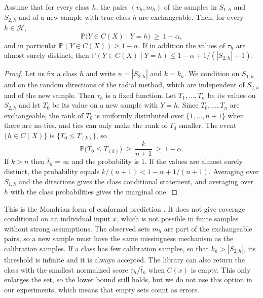 \begin{theorem}\label{thm:coverage}
Assume that for every class $h$, the pairs $(v_h,m_h)$ of the samples in $S_{1,h}$ and $S_{2,h}$ and of a new sample with true 
class $h$ are exchangeable. Then, for every $h\in\mathcal H$,
\[ \mathbb P\bigl(Y\in C(X)\mid Y=h\bigr)\ \ge\ 1-\alpha ,\]
and in particular $\mathbb P(Y\in C(X))\ge 1-\alpha$. If in addition the values of $\tau_h$ are almost surely distinct, then 
$\mathbb P(Y\in C(X)\mid Y=h)\le 1-\alpha+1/(|S_{2,h}|+1)$.
\end{theorem}

\begin{proof}
Let us fix a class $h$ and write $n=|S_{2,h}|$ and $k=k_h$. We condition on $S_{1,h}$ and on the random directions of the radial 
method, which are independent of $S_{2,h}$ and of the new sample. Then $\tau_h$ is a fixed function. Let $T_1,\dots,T_n$ be its 
values on $S_{2,h}$ and let $T_0$ be its value on a new sample with $Y=h$. Since $T_0, \dots, T_n$ are exchangeable, the rank of 
$T_0$ is uniformly distributed over $\{1, \dots, n+1\}$ when there are no ties, and ties can only make the rank of $T_0$ smaller. 
The event $\{h\in C(X)\}$ is $\{T_0\le T_{(k)}\}$, so  \[ \mathbb P\bigl(T_0\le T_{(k)}\bigr)\ \ge\ \frac{k}{n+1}\ \ge\ 1-\alpha .\]
If $k>n$ then $\hat t_h=\infty$ and the probability is $1$. If the values are almost surely distinct, the probability equals 
$k/(n+1)<1-\alpha+1/(n+1)$. Averaging over $S_{1,h}$ and the directions gives the class conditional statement, and averaging over 
$h$ with the class probabilities gives the marginal one.
\end{proof}

This is the Mondrian form of conformal prediction \cite{vovk2005algorithmic}. It does not give coverage conditional on an 
individual input $x$, which is not possible in finite samples without strong assumptions. The observed sets $m_h$ are part of the 
exchangeable pairs, so a new sample must have the same missingness mechanism as the calibration samples. If a class has few 
calibration samples, so that $k_h>|S_{2,h}|$, its threshold is infinite and it is always accepted. The library can also return 
the class with the smallest normalized score $\tau_h/\hat t_h$ when $C(x)$ is empty. This only enlarges the set, so the lower 
bound still holds, but we do not use this option in our experiments, which means that empty sets count as errors.
